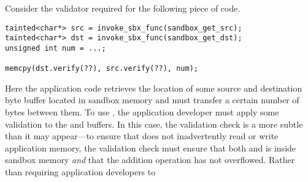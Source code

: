 

%
Consider the validator required for the following piece of code.
%
\begin{verbatim}
tainted<char*> src = invoke_sbx_func(sandbox_get_src);
tainted<char*> dst = invoke_sbx_func(sandbox_get_dst);
unsigned int num = ...;

memcpy(dst.verify(??), src.verify(??), num);
\end{verbatim}
%
Here the application code retrieves the location of some source and destination 
byte buffer located in sandbox memory and must transfer a certain number of 
bytes between them.
%
To use , the application developer must apply some validation to 
the  and  buffers.
%
In this case, the validation check is a more subtle than it may appear---to 
ensure that  does not inadvertently read or write application 
memory, the validation check must ensure that both  and 
 is inside sandbox memory \emph{and} that the addition 
operation has not overflowed.
%
Rather than requiring application developers to 